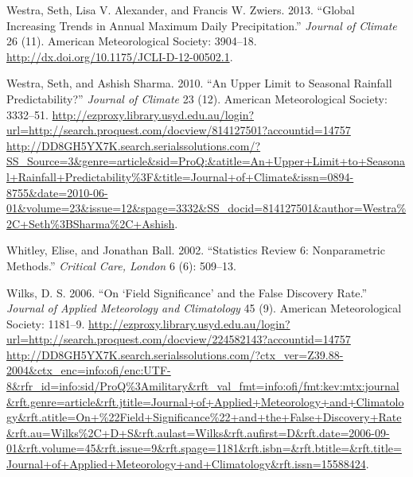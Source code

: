 \documentclass[]{elsarticle} %
\theoremstyle{definition}
\theoremstyle{definition}
\theoremstyle{definition}
\theoremstyle{remark}
\begin{document}
\hypertarget{ref-Westra2013}{}
Westra, Seth, Lisa V. Alexander, and Francis W. Zwiers. 2013. ``Global
Increasing Trends in Annual Maximum Daily Precipitation.'' \emph{Journal
of Climate} 26 (11). American Meteorological Society: 3904--18.
\url{http://dx.doi.org/10.1175/JCLI-D-12-00502.1}.

\hypertarget{ref-Westra2010}{}
Westra, Seth, and Ashish Sharma. 2010. ``An Upper Limit to Seasonal
Rainfall Predictability?'' \emph{Journal of Climate} 23 (12). American
Meteorological Society: 3332--51.
\href{http://ezproxy.library.usyd.edu.au/login?url=http://search.proquest.com/docview/814127501?accountid=14757\%20http://DD8GH5YX7K.search.serialssolutions.com/?SS_Source=3\&genre=article\&sid=ProQ:\&atitle=An+Upper+Limit+to+Seasonal+Rainfall+Predictability\%3F\&title=Journal+of+Climate\&issn=0894-8755\&date=2010-06-01\&volume=23\&issue=12\&spage=3332\&SS_docid=814127501\&author=Westra\%2C+Seth\%3BSharma\%2C+Ashish}{http://ezproxy.library.usyd.edu.au/login?url=http://search.proquest.com/docview/814127501?accountid=14757 http://DD8GH5YX7K.search.serialssolutions.com/?SS\_Source=3\&genre=article\&sid=ProQ:\&atitle=An+Upper+Limit+to+Seasonal+Rainfall+Predictability\%3F\&title=Journal+of+Climate\&issn=0894-8755\&date=2010-06-01\&volume=23\&issue=12\&spage=3332\&SS\_docid=814127501\&author=Westra\%2C+Seth\%3BSharma\%2C+Ashish}.

\hypertarget{ref-Whitley2002}{}
Whitley, Elise, and Jonathan Ball. 2002. ``Statistics Review 6:
Nonparametric Methods.'' \emph{Critical Care, London} 6 (6): 509--13.

\hypertarget{ref-Wilks2006}{}
Wilks, D. S. 2006. ``On `Field Significance' and the False Discovery
Rate.'' \emph{Journal of Applied Meteorology and Climatology} 45 (9).
American Meteorological Society: 1181--9.
\href{http://ezproxy.library.usyd.edu.au/login?url=http://search.proquest.com/docview/224582143?accountid=14757\%20http://DD8GH5YX7K.search.serialssolutions.com/?ctx_ver=Z39.88-2004\&ctx_enc=info:ofi/enc:UTF-8\&rfr_id=info:sid/ProQ\%3Amilitary\&rft_val_fmt=info:ofi/fmt:kev:mtx:journal\&rft.genre=article\&rft.jtitle=Journal+of+Applied+Meteorology+and+Climatology\&rft.atitle=On+\%22Field+Significance\%22+and+the+False+Discovery+Rate\&rft.au=Wilks\%2C+D+S\&rft.aulast=Wilks\&rft.aufirst=D\&rft.date=2006-09-01\&rft.volume=45\&rft.issue=9\&rft.spage=1181\&rft.isbn=\&rft.btitle=\&rft.title=Journal+of+Applied+Meteorology+and+Climatology\&rft.issn=15588424}{http://ezproxy.library.usyd.edu.au/login?url=http://search.proquest.com/docview/224582143?accountid=14757 http://DD8GH5YX7K.search.serialssolutions.com/?ctx\_ver=Z39.88-2004\&ctx\_enc=info:ofi/enc:UTF-8\&rfr\_id=info:sid/ProQ\%3Amilitary\&rft\_val\_fmt=info:ofi/fmt:kev:mtx:journal\&rft.genre=article\&rft.jtitle=Journal+of+Applied+Meteorology+and+Climatology\&rft.atitle=On+\%22Field+Significance\%22+and+the+False+Discovery+Rate\&rft.au=Wilks\%2C+D+S\&rft.aulast=Wilks\&rft.aufirst=D\&rft.date=2006-09-01\&rft.volume=45\&rft.issue=9\&rft.spage=1181\&rft.isbn=\&rft.btitle=\&rft.title=Journal+of+Applied+Meteorology+and+Climatology\&rft.issn=15588424}.
\end{document}

